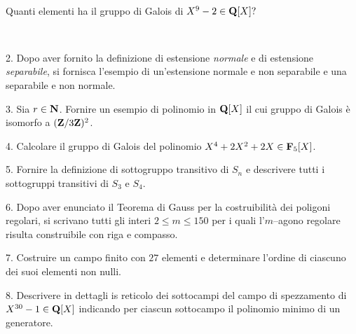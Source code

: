 \ \dotfill\ \bigskip\bigskip\bigskip\vfil

 Quanti elementi ha il gruppo di Galois di $X^9-2\in{\bf Q}[X]?$\medskip\bigskip\bigskip

\ \dotfill\ \bigskip\bigskip\bigskip


\vfil\eject


\item{2.} Dopo aver fornito la definizione di estensione {\it normale} e di estensione {\it separabile}, si fornisca l'esempio di un'estensione normale e non separabile e una separabile e non normale.
\vv


\item{3.} Sia $r\in{\bf N}$. Fornire un esempio di polinomio in ${\bf Q}[X]$ il cui gruppo di Galois
\`e isomorfo a $({\bf Z}/3{\bf Z})^2$.\ve\ \vs

\item{4.} Calcolare il gruppo di Galois del polinomio $X^4+2X^2+2X\in{\bf F}_5[X]$. \vv

\item{5.} Fornire la definizione di sottogruppo transitivo di $S_n$ e descrivere tutti i sottogruppi transitivi di $S_3$ e $S_4$.
\ve\ \vs

\item{6.} Dopo aver enunciato il Teorema di Gauss per la costruibilit\`a dei poligoni regolari, si scrivano tutti gli interi $2\le m\le 150$ per i quali l'$m$--agono regolare risulta construibile con riga e compasso.\vskip 6cm\bigskip\bigskip\bigskip\vv\vv

\item{7.} Costruire un campo finito con $27$ elementi e determinare l'ordine di ciascuno dei suoi elementi non nulli.\vskip 6cm\bigskip\bigskip\bigskip\vv\vv



\item{8.} Descrivere in dettagli is reticolo dei sottocampi del campo di spezzamento di $X^{30}-1\in{\bf Q}[X]$ indicando per ciascun sottocampo il polinomio minimo di un generatore.
\ \vst

 \bye

